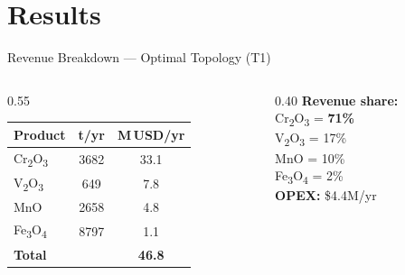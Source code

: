 \documentclass[aspectratio=169]{beamer}
\begin{document}
\section{Results}

\begin{frame}{Revenue Breakdown --- Optimal Topology (T1)}
\begin{columns}[T]
\begin{column}{0.55\textwidth}
\begin{table}
\centering
\begin{tabular}{@{}lcc@{}}
\toprule
\textbf{Product} & \textbf{t/yr} & \textbf{M\,USD/yr} \\
\midrule
Cr\textsubscript{2}O\textsubscript{3} & \num{3682} & \textcolor{StepGreen}{33.1} \\
V\textsubscript{2}O\textsubscript{3}  & 649        & \textcolor{StepGreen}{7.8} \\
MnO & \num{2658} & \textcolor{StepGreen}{4.8} \\
Fe\textsubscript{3}O\textsubscript{4} & \num{8797} & \textcolor{StepGreen}{1.1} \\
\midrule
\textbf{Total} & & \textbf{\textcolor{StepGreen}{46.8}} \\
\bottomrule
\end{tabular}
\end{table}
\end{column}
\begin{column}{0.40\textwidth}
\textbf{Revenue share:}\\[0.5em]
Cr\textsubscript{2}O\textsubscript{3} = \textbf{71\%}\\
V\textsubscript{2}O\textsubscript{3} = 17\%\\
MnO = 10\%\\
Fe\textsubscript{3}O\textsubscript{4} = 2\%\\[1em]
\textcolor{StepRed}{\textbf{OPEX:} \$4.4M/yr}
\end{column}
\end{columns}
\end{frame}
\end{document}
